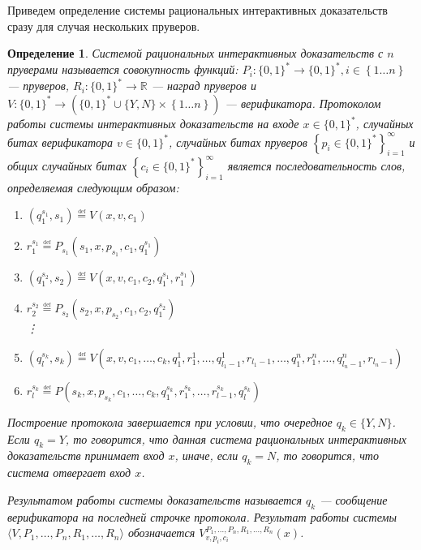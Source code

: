\documentclass[14pt, a4paper]{extreport}
\newtheorem{definition}{\indent Определение}
\newcommand{\word}{\{0, 1\}^*}
\newcommand{\defeq}{\overset{\underset{\mathrm{def}}{}}{=}}
\newcommand{\set}[1]{\left\{#1\right\}}
\begin{document}
Приведем определение системы рациональных интерактивных доказательств сразу для случая нескольких пруверов.
\begin{definition}
    Системой рациональных интерактивных доказательств с $n$ пруверами называется совокупность функций: $P_i: \word \longrightarrow \word, i \in \set{1\ldots n}$ --- пруверов, $R_i: \word \longrightarrow \mathbb{R}$ --- наград пруверов и $V: \word \longrightarrow \left(\word \cup \{Y, N\} \times \set{1 \dots n}\right)$ --- верификатора. Протоколом работы системы интерактивных доказательств на входе $x \in \word$, случайных битах верификатора $v \in \word$, случайных битах пруверов $\left\{p_i\in \word\right\}_{i=1}^{\infty}$ и общих случайных битах $\left\{c_i\in \word\right\}_{i=1}^{\infty}$ является последовательность слов, определяемая следующим образом:
    \begin{enumerate}
        \item $(q^{s_1}_1, s_1) \defeq V(x, v, c_1)$
        \item $r^{s_1}_1 \defeq P_{s_1}(s_1, x, p_{s_1}, c_1, q^{s_1}_1)$
        \item $(q^{s_2}_1, s_2) \defeq V(x, v, c_1, c_2, q^{s_1}_1, r^{s_1}_1)$
        \item $r^{s_2}_2 \defeq P_{s_2}(s_2, x, p_{s_2}, c_1, c_2, q^{s_2}_1)$\\
            \vdots
        \item[(2k-1).] $(q^{s_k}_l, s_k) \defeq V(x, v, c_1, \ldots, c_k, q^1_1, r^1_1, \ldots, q^1_{l_1-1}, r_{l_1-1}, \ldots, q^n_1, r^n_1, \ldots, q^n_{l_n-1}, r_{l_n-1})$
        \item[(2k).] $r^{s_k}_l \defeq P(s_k, x, p_{s_k}, c_1, \ldots, c_k, q^{s_k}_1, r^{s_k}_1, \ldots, r^{s_k}_{l-1}, q^{s_k}_l)$
    \end{enumerate}
    Построение протокола завершается при условии, что очередное $q_k \in \{Y, N\}$. Если $q_k = Y$, то говорится, что данная система рациональных интерактивных доказательств принимает вход $x$, иначе, если $q_k = N$, то говорится, что система отвергает вход $x$.

    Результатом работы системы доказательств называется $q_k$ --- сообщение верификатора на последней строчке протокола. Результат работы системы $\langle V, P_1, \ldots, P_n, R_1, \ldots, R_n\rangle$ обозначается $V^{P_1, \ldots, P_n, R_1, \ldots, R_n}_{v, p_i, c_i}(x)$.
\end{definition}
\end{document}
